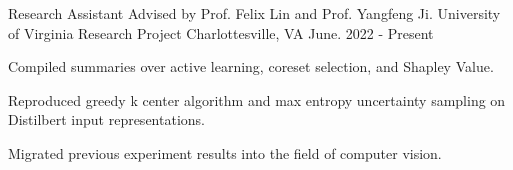 


\begin{cventries}
    \cventry
      {Research Assistant Advised by Prof. Felix Lin and Prof. Yangfeng Ji.}
      {University of Virginia Research Project}
      {Charlottesville, VA}
      {June. 2022 - Present}
      {
        \begin{cvitems} %
          \item {Compiled summaries over active learning, coreset selection, and Shapley Value.}
          \item {Reproduced greedy k center algorithm and max entropy uncertainty sampling on Distilbert input representations.}
          \item {Migrated previous experiment results into the field of computer vision.}
        \end{cvitems}
      }
  \end{cventries}
